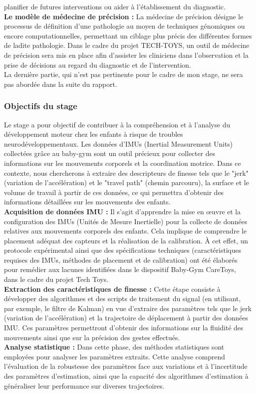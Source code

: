 \documentclass[5pt]{article}
\begin{document}
planifier de futures interventions ou aider à l’établissement du diagnostic. \\
\textbf{Le modèle de médecine de précision : } La médecine de précision désigne le processus de définition
d’une pathologie au moyen de techniques génomiques ou encore computationnelles, permettant un ciblage
plus précis des différentes formes de ladite pathologie. Dans le cadre du projet TECH-TOYS, un
outil de médecine de précision sera mis en place afin d’assister les cliniciens dans l’observation et la prise
de décisions au regard du diagnostic et de l’intervention. \\

La dernière partie, qui n'est pas pertinente pour le cadre de mon stage, ne sera pas abordée dans la suite du rapport.

\subsubsection{Objectifs du stage}

Le stage a pour objectif de contribuer à la compréhension et à l'analyse du développement moteur chez les enfants à risque de troubles neurodéveloppementaux. Les données d'IMUs (Inertial Measurement Units) collectées grâce au baby-gym sont un outil précieux pour collecter des informations sur les mouvements corporels et la coordination motrice. Dans ce contexte, nous chercherons à extraire des descripteurs de finesse tels que le "jerk" (variation de l'accélération) et le "travel path" (chemin parcouru), la surface et le volume de travail à partir de ces données, ce qui permettra d'obtenir des informations détaillées sur les mouvements des enfants. \\
\textbf{Acquisition de données IMU :} Il s'agit d'apprendre la mise en œuvre et la configuration des IMUs (Unités de Mesure Inertielle) pour la collecte de données relatives aux mouvements corporels des enfants. Cela implique de comprendre le placement adéquat des capteurs et la réalisation de la calibration. À cet effet, un protocole expérimental ainsi que des spécifications techniques (caractéristiques requises des IMUs, méthodes de placement et de calibration) ont été élaborés pour remédier aux lacunes identifiées dans le dispositif Baby-Gym CareToys, dans le cadre du projet Tech Toys.\\
\textbf{Extraction des caractéristiques de finesse :} Cette étape consiste à développer des algorithmes et des scripts de traitement du signal (en utilisant, par exemple, le filtre de Kalman) en vue d'extraire des paramètres tels que le jerk (variation de l'accélération) et la trajectoire de déplacement à partir des données IMU. Ces paramètres permettront d'obtenir des informations sur la fluidité des mouvements ainsi que sur la précision des gestes effectués.\\
\textbf{Analyse statistique :} Dans cette phase, des méthodes statistiques sont employées pour analyser les paramètres extraits. Cette analyse comprend l'évaluation de la robustesse des paramètres face aux variations et à l'incertitude des paramètres d'estimation, ainsi que la capacité des algorithmes d'estimation à généraliser leur performance sur diverses trajectoires.
\end{document}
